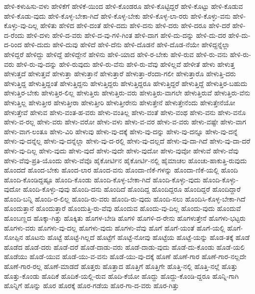 {ಹೇಳಿ-ಕಳುಹಿಸು-ವಳು
ಹೇಳಿಕೆಗೆ
ಹೇಳಿಕೆ-ಯಿಂದ
ಹೇಳಿ-ಕೊಂಡರೂ
ಹೇಳಿ-ಕೊಟ್ಟಿದ್ದರೆ
ಹೇಳಿ-ಕೊಟ್ಟು
ಹೇಳಿ-ಕೊಡುವ
ಹೇಳಿ-ಕೊಡು-ವುದು
ಹೇಳಿ-ಕೊಳ್ಳ-ಬೇಕಾ-ಗಿದೆ
ಹೇಳಿ-ಕೊಳ್ಳ-ಬೇಕು
ಹೇಳಿ-ಕೊಳ್ಳ-ಲಾ-ರರು
ಹೇಳಿ-ಕೊಳ್ಳು-ವನು
ಹೇಳಿ-ಕೊಳ್ಳು-ವು-ದಿಲ್ಲ
ಹೇಳಿತು
ಹೇಳಿದ
ಹೇಳಿ-ದಂತೆ
ಹೇಳಿ-ದದು
ಹೇಳಿ-ದನು
ಹೇಳಿ-ದರು
ಹೇಳಿ-ದರೂ
ಹೇಳಿ-ದರೆ
ಹೇಳಿ-ದ-ರೆಂದು
ಹೇಳಿ-ದಳು
ಹೇಳಿ-ದ-ವರು
ಹೇಳಿ-ದ-ವು-ಗಳಿ-ಗಿಂತ
ಹೇಳಿ-ದಾಗ
ಹೇಳಿ-ದು-ದನ್ನು
ಹೇಳಿ-ದು-ದರ
ಹೇಳಿ-ದು-ದ-ರಿಂದ
ಹೇಳಿ-ದುದು
ಹೇಳಿ-ದುವು
ಹೇಳಿದೆ
ಹೇಳಿ-ದೆನು
ಹೇಳಿ-ದೊಡನೆ
ಹೇಳಿ-ದೊಡ-ನೆಯೇ
ಹೇಳಿದ್ದನ್ನೆಲ್ಲಾ
ಹೇಳಿದ್ದರೆ
ಹೇಳಿದ್ದು
ಹೇಳಿದ್ದೆ
ಹೇಳಿದ್ದೇನೆ
ಹೇಳಿನು
ಹೇಳಿ-ಯಾದ
ಹೇಳಿ-ರ-ಬೇಕು
ಹೇಳಿ-ರುವ
ಹೇಳಿ-ರು-ವನು
ಹೇಳಿ-ರು-ವರು
ಹೇಳಿ-ರು-ವು-ದನ್ನು
ಹೇಳಿ-ರುವುದು
ಹೇಳಿ-ರು-ವೆನು
ಹೇಳಿ-ರು-ವೆವು
ಹೇಳಿಲ್ಲವೆ
ಹೇಳೀತೆ
ಹೇಳು
ಹೇಳುತ್ತ
ಹೇಳುತ್ತದೆ
ಹೇಳುತ್ತವೆ
ಹೇಳುತ್ತಾ
ಹೇಳುತ್ತಾನೆ
ಹೇಳುತ್ತಾರೆ
ಹೇಳುತ್ತಾ-ರೆಂದಾ-ಗಲೀ
ಹೇಳುತ್ತಾರೊ
ಹೇಳುತ್ತಿ-ದರು
ಹೇಳುತ್ತಿದ್ದ
ಹೇಳುತ್ತಿದ್ದಂತೆ
ಹೇಳುತ್ತಿದ್ದನು
ಹೇಳುತ್ತಿದ್ದರು
ಹೇಳುತ್ತಿದ್ದರೂ
ಹೇಳುತ್ತಿದ್ದರೆ
ಹೇಳುತ್ತಿದ್ದೆ
ಹೇಳುತ್ತಿರ-ಬಹುದು
ಹೇಳುತ್ತಿರ-ಬೇಕು
ಹೇಳುತ್ತಿರ-ಲಿಲ್ಲ
ಹೇಳುತ್ತಿರು
ಹೇಳುತ್ತಿರು-ವರು
ಹೇಳುತ್ತಿರು-ವಾಗಲೇ
ಹೇಳುತ್ತಿರುವೆ
ಹೇಳುತ್ತಿರು-ವೆನು
ಹೇಳುತ್ತಿಲ್ಲ
ಹೇಳುತ್ತೀರ
ಹೇಳುತ್ತೀರಾ
ಹೇಳುತ್ತೀರಿ
ಹೇಳುತ್ತೀರೇನು
ಹೇಳುತ್ತೇನೆ
ಹೇಳುತ್ತೇನೆಂದು
ಹೇಳುತ್ತೇನೆಯೋ
ಹೇಳುತ್ತೇವೆ
ಹೇಳುವ
ಹೇಳು-ವಂತ-ಹ-ವರು
ಹೇಳು-ವಂತಿಲ್ಲ
ಹೇಳು-ವಂತೆ
ಹೇಳು-ವಂಥ
ಹೇಳು-ವನು
ಹೇಳು-ವನೊ
ಹೇಳು-ವ-ರಲ್ಲ
ಹೇಳು-ವರು
ಹೇಳು-ವರೋ
ಹೇಳು-ವಳು
ಹೇಳು-ವ-ವರ
ಹೇಳು-ವ-ವರು
ಹೇಳು-ವಷ್ಟೇ
ಹೇಳು-ವಾಗ
ಹೇಳು-ವಾಗ-ಲಂತೂ
ಹೇಳು-ವಿರಿ
ಹೇಳುವು
ಹೇಳು-ವು-ದಕ್ಕೆ
ಹೇಳು-ವು-ದನ್ನು
ಹೇಳು-ವು-ದನ್ನೂ
ಹೇಳು-ವು-ದನ್ನೆ
ಹೇಳು-ವು-ದನ್ನೆಲ್ಲ
ಹೇಳು-ವು-ದನ್ನೆಲ್ಲಾ
ಹೇಳು-ವು-ದ-ರಲ್ಲಿ
ಹೇಳು-ವು-ದಲ್ಲದೆ
ಹೇಳು-ವು-ದಾ-ಗಿದೆ
ಹೇಳು-ವು-ದಾ-ದರೆ
ಹೇಳು-ವು-ದಿಲ್ಲ
ಹೇಳು-ವುದು
ಹೇಳು-ವುದೆ
ಹೇಳು-ವುದೇ
ಹೇಳು-ವುದೋ
ಹೇಳು-ವುವೋ
ಹೇಳುವೆ
ಹೇಳು-ವೆವು
ಹೇಳು-ವೆವು-ಪ್ರತಿ-ಯೊಂದು
ಹೇಳು-ವೆವೊ
ಹೈಕೋರ್ಟಿನ
ಹೈಕೋರ್ಟಿ-ನಲ್ಲಿ
ಹೈಮಾಚಲ
ಹೊಂಚು-ಹಾಕುತ್ತಿ-ರುವುದು
ಹೊಂದದೆ
ಹೊಂದ-ಬೇಕು
ಹೊಂದ-ಲಾರ
ಹೊಂದ-ವನು
ಹೊಂದಾ-ಣಿಕೆ-ಗಳನ್ನು
ಹೊಂದಾ-ಣಿಕೆ-ಯಲ್ಲಿ
ಹೊಂದಿ
ಹೊಂದಿ-ಕೊಂಡಿದ್ದಷ್ಟೂ
ಹೊಂದಿ-ಕೊಂಡು
ಹೊಂದಿ-ಕೊಳ್ಳ-ಬೇಕಾ-ಗಿದೆ
ಹೊಂದಿ-ಕೊಳ್ಳು-ವುದು
ಹೊಂದಿ-ಕೊಳ್ಳು-ವುದೋ
ಹೊಂದಿ-ಕೊಳ್ಳು-ವುವು
ಹೊಂದಿ-ದನು
ಹೊಂದಿದೆ
ಹೊಂದಿದ್ದ
ಹೊಂದಿದ್ದರೂ
ಹೊಂದಿದ್ದರೆ
ಹೊಂದಿದ್ದಾರೆ
ಹೊಂದಿ-ಬನ್ನಿ
ಹೊಂದಿ-ರ-ಲಿಲ್ಲ
ಹೊಂದಿ-ರು-ವರು
ಹೊಂದಿ-ರು-ವುದು
ಹೊಂದಿ-ಸಲು
ಹೊಂದಿಸಿ-ಕೊಳ್ಳ-ಬೇಕಾ-ಗಿದೆ
ಹೊಂದುತ್ತಾನೆ
ಹೊಂದುತ್ತಾರೆ
ಹೊಂದುತ್ತಿ-ರು-ವೆವು
ಹೊಂದುವ
ಹೊಂದು-ವು-ದಿಲ್ಲ
ಹೊಂದು-ವುದು
ಹೊಂದುವೆ
ಹೊಂಬಣ್ಣದ
ಹೊಕ್ಕಾ-ಗಿತ್ತು
ಹೊಕ್ಕಿತು
ಹೊಗಳ-ಬೇಡಿ
ಹೊಗಳಿ
ಹೊಗಳಿ-ದ-ರೇನು
ಹೊಗಳುತ್ತೇನೆ
ಹೊಗಳು-ಭಟ್ಟರು
ಹೊಗಳು-ವರು
ಹೊಗಳು-ವು-ದಲ್ಲ
ಹೊಗಳು-ವುದು
ಹೊಗಳು-ವೆವು
ಹೊಗೆ
ಹೊಗೆ-ಯಂತೆ
ಹೊಗೆ-ಯಲ್ಲಿ
ಹೊಗೆ-ಸೋಪ್ಪಿನ
ಹೊಟನು
ಹೊಟ್ಟೆ
ಹೊಟ್ಟೆ-ಗಿಲ್ಲದೆ
ಹೊಟ್ಟೆಗೆ
ಹೊಟ್ಟೆ-ನೋವು
ಹೊಟ್ಟೆಯ
ಹೊಟ್ಟೆ-ಯನ್ನು
ಹೊಡ-ತಕ್ಕೆ
ಹೊಡೆ
ಹೊಡೆದ
ಹೊಡೆ-ದರು
ಹೊಡೆ-ದರೆ
ಹೊಡೆ-ದಾಡು-ವರು
ಹೊಡೆ-ದಾಡು-ವುದು
ಹೊಡೆ-ದು-ಕೊಂಡು
ಹೊಡೆ-ಯಲಿ
ಹೊಡೆಯು
ಹೊಡೆ-ಯುವ
ಹೊಡೆ-ಯು-ವ-ವನು
ಹೊಡೆ-ಯು-ವು-ದಕ್ಕೆ
ಹೊಣೆ
ಹೊಣೆ-ಗಾರ
ಹೊಣೆ-ಗಾರ-ನಲ್ಲದೇ
ಹೊಣೆ-ಗಾರ-ರಲ್ಲ
ಹೊಣೆ-ಮಾಡದೆ
ಹೊತ್ತರು
ಹೊತ್ತಾದ
ಹೊತ್ತಿಗೆ
ಹೊತ್ತಿಗೇ
ಹೊತ್ತಿ-ನಲ್ಲಿ
ಹೊತ್ತಿ-ನಲ್ಲೆ
ಹೊತ್ತು
ಹೊತ್ತು-ಕೊಂಡು
ಹೊದಿಕೆ
ಹೊದಿಕೆ-ಯಲ್ಲಿ-ರುವ
ಹೊದಿ-ಕೆಯೋ
ಹೊದ್ದು
ಹೊದ್ದು-ಕೊಂಡಿ-ದ್ದರೂ
ಹೊನ್ನಿ-ಗಾಗಿ
ಹೊನ್ನಿಗೆ
ಹೊನ್ನು
ಹೊರ
ಹೊರಕ್ಕೆ
ಹೊರ-ಗಡೆಯ
ಹೊರ-ಗಾ-ದ-ವರು
ಹೊರ-ಗಿತ್ತು
}
